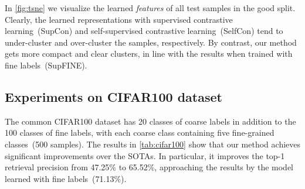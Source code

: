 \documentclass[10pt,twocolumn,letterpaper]{article}
\begin{document}
In \cref{fig:tsne} we visualize the learned \textit{features} of all test samples in the good split. Clearly, the learned representations with supervised contrastive learning~(SupCon) and self-supervised contrastive learning~(SelfCon) tend to under-cluster and over-cluster the samples, respectively. By contrast, our method gets more compact and clear clusters, in line with the results when trained with fine labels~(SupFINE).


\subsection{Experiments on CIFAR100 dataset}\label{exp:cifar100}
The common CIFAR100 dataset has 20 classes of coarse labels in addition to the 100 classes of fine labels, with each coarse class containing five fine-grained classes~(500 samples). The results in \cref{tab:cifar100} show that our method achieves significant improvements over the SOTAs. In particular, it improves the top-1 retrieval precision from 47.25\% to 65.52\%, approaching the results by the model learned with fine labels~(71.13\%). 
\begin{table}[htbp]
\centering
{}
\caption{Results on CIFAR100 dataset.}
\label{tab:cifar100}
\end{table}
\end{document}
